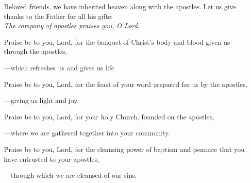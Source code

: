 \intercessions\indent

\begin{hangpar}

Beloved friends, we have inherited heaven along with the apostles. Let us give thanks to the Father for all his gifts:\\
\emph{The company of apostles praises you, O Lord.}

\medskip Praise be to you, Lord, for the banquet of Christ’s body and blood given us through the apostles,

{\color{red}---\thinspace}which refreshes us and gives us life

\medskip Praise be to you, Lord, for the feast of your word prepared for us by the apostles,

{\color{red}---\thinspace}giving us light and joy.

\medskip Praise be to you, Lord, for your holy Church, founded on the apostles,

{\color{red}---\thinspace}where we are gathered together into your community.

\medskip Praise be to you, Lord, for the cleansing power of baptism and penance that you have entrusted to your apostles,

{\color{red}---\thinspace}through which we are cleansed of our sins.

\end{hangpar}